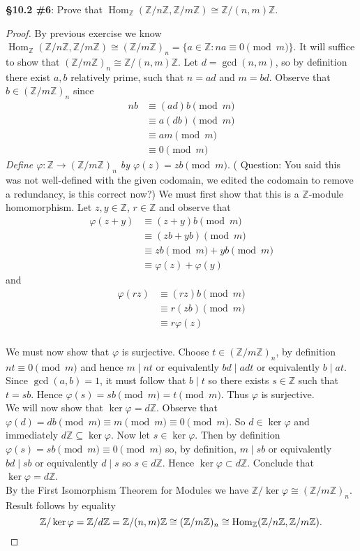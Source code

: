 \documentclass[8pt]{amsart}
\theoremstyle{plain}%
\theoremstyle{definition}
\theoremstyle{remark}
\numberwithin{equation}{section}
\newcommand{\Z}{\mathbb{Z}}
\begin{document}
\textbf{\S 10.2 \#6}: Prove that $\operatorname{Hom}_\Z(\Z/n\Z, \Z/m\Z) \cong \Z/(n, m)\Z$.
	\begin{proof}
		By previous exercise we know $\operatorname{Hom}_\Z(\Z/n\Z, \Z/m\Z) \cong (\Z/m\Z)_n = \{a \in \Z : na \equiv 0 \pmod m \}$. It will suffice to show that $(\Z/m\Z)_n \cong \Z/(n, m)\Z$. Let $d = \gcd(n, m)$, so by definition there exist $a, b$ relatively prime, such that $n = ad$ and $m = bd$. Observe that $b \in (\Z/m\Z)_n$ since
		\begin{align*}
			nb &\equiv (ad)b \pmod m\\
			&\equiv a(db) \pmod m\\
			&\equiv am \pmod m\\
			&\equiv 0 \pmod m
		\end{align*}
		\textit{Define $\varphi : \Z \to (\Z/m\Z)_n$ by $\varphi(z) = zb \pmod m$}. ({\color{green} Question: You said this was not well-defined with the given codomain, we edited the codomain to remove a redundancy, is this correct now?}) We must first show that this is a $\Z$-module homomorphism. Let $z, y \in \Z$, $r \in \Z$ and observe that
		\begin{align*}
			\varphi(z + y) &\equiv (z + y)b \pmod m\\
			&\equiv (zb + yb) \pmod m\\
			&\equiv zb \pmod m + yb \pmod m\\
			&\equiv \varphi(z) + \varphi(y)
		\end{align*}
		and
		\begin{align*}
			\varphi(rz) &\equiv (rz)b \pmod m\\
			&\equiv r(zb)\pmod m\\
			&\equiv r \varphi(z)\\
		\end{align*}

		We must now show that $\varphi$ is surjective. Choose $t \in (\Z/m\Z)_n$, by definition $nt \equiv 0 \pmod m$ and hence $m \mid nt$ or equivalently $bd \mid adt$ or equivalently $b \mid at$. Since $\gcd(a, b) = 1$, it must follow that $b \mid t$ so there exists $s \in \Z$ such that $t = sb$. Hence $\varphi(s) = sb \pmod m = t \pmod m$. Thus $\varphi$ is surjective. \\

		We will now show that $\ker \varphi = d\Z$. Observe that $\varphi(d) = db \pmod m \equiv m \pmod m \equiv 0 \pmod m$. So $d \in \ker \varphi$ and immediately $d\Z \subseteq \ker \varphi$. Now let $s \in \ker \varphi$. Then by definition $\varphi(s) = sb \pmod m \equiv 0 \pmod m$ so, by definition, $m \mid sb$ or equivalently $bd \mid sb$ or equivalently $d \mid s$ so $s \in d\Z$. Hence $\ker\varphi \subset d\Z$. Conclude that $\ker\varphi = d\Z$.\\

		By the First Isomorphism Theorem for Modules we have $\Z/\ker\varphi \cong (\Z/m\Z)_n$. Result follows by equality  $$\Z/\ker \varphi = \Z/d\Z = \Z/(n, m)\Z \cong (\Z/m\Z)_n \cong \operatorname{Hom}_\Z(\Z/n\Z, \Z/m\Z).\qedhere$$

	\end{proof}
\end{document}
